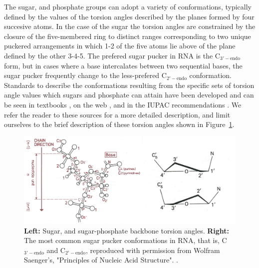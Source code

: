 The sugar, and phosphate groups  can adopt a variety of conformations,
typically defined by the values of the torsion angles described by the
planes formed by  four succesive atoms.  In the case  of the sugar the
torsion  angles are constrained  by the  closure of  the five-membered
ring  to   distinct  ranges  corresponding  to   two  unique  puckered
arrangements in  which 1-2 of  the five atoms  lie above of  the plane
defined by the  other 3-4-5.  The prefered sugar pucker  in RNA is the
C$_{3'-\textrm{endo}}$ form,  but in  cases where a  base intercalates
between two  sequential bases, the  sugar pucker frequently  change to
the  less-prefered C$_{2'-\textrm{endo}}$ conformation.   Standards to
describe the conformations resulting from the specific sets of torsion
angle values which sugars and phosphate can attain have been developed
and  can   be  seen  in  textbooks  \cite{saenger1984},   on  the  web
\cite{jenaurl}, and in the IUPAC recommendations \cite{iupac1983}.  We
refer the reader to these sources for a more detailed description, and
limit ourselves to the brief description of these torsion angles shown
in Figure~\ref{fig:puckersbbone}.

\begin{figure}
\centering
\includegraphics[scale=1.8, angle=0]{Chapter1/torsions.png}
\caption{\textbf{Left:}  Sugar, and  sugar-phosphate  backbone torsion
  angles. \textbf{Right:}  The most common  sugar pucker conformations
  in RNA, that  is, C$_{3'-\textrm{endo}}$ and C$_{2'-\textrm{endo}}$,
  reproduced  with permission from  Wolfram Saenger's,  "Principles of
  Nucleic Acid Structure". \cite{saenger1984}.}
\label{fig:puckersbbone}
\end{figure}  



